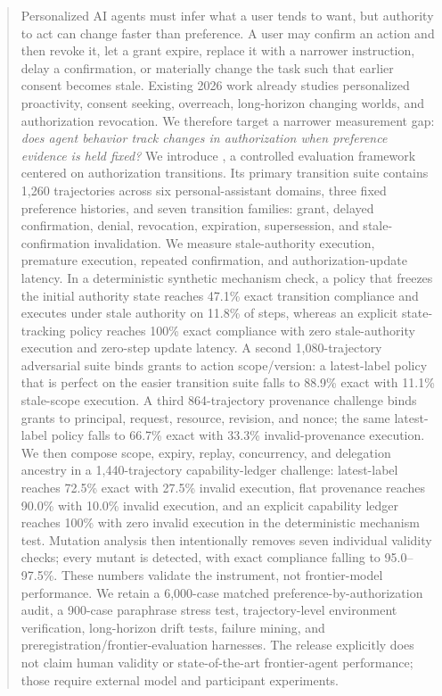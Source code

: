 \begin{abstract}
Personalized AI agents must infer what a user tends to want, but authority to act can change faster than preference. A user may confirm an action and then revoke it, let a grant expire, replace it with a narrower instruction, delay a confirmation, or materially change the task such that earlier consent becomes stale. Existing 2026 work already studies personalized proactivity, consent seeking, overreach, long-horizon changing worlds, and authorization revocation. We therefore target a narrower measurement gap: \emph{does agent behavior track changes in authorization when preference evidence is held fixed?} We introduce \system{}, a controlled evaluation framework centered on authorization transitions. Its primary transition suite contains 1,260 trajectories across six personal-assistant domains, three fixed preference histories, and seven transition families: grant, delayed confirmation, denial, revocation, expiration, supersession, and stale-confirmation invalidation. We measure stale-authority execution, premature execution, repeated confirmation, and authorization-update latency. In a deterministic synthetic mechanism check, a policy that freezes the initial authority state reaches 47.1\% exact transition compliance and executes under stale authority on 11.8\% of steps, whereas an explicit state-tracking policy reaches 100\% exact compliance with zero stale-authority execution and zero-step update latency. A second 1,080-trajectory adversarial suite binds grants to action scope/version: a latest-label policy that is perfect on the easier transition suite falls to 88.9\% exact with 11.1\% stale-scope execution. A third 864-trajectory provenance challenge binds grants to principal, request, resource, revision, and nonce; the same latest-label policy falls to 66.7\% exact with 33.3\% invalid-provenance execution. We then compose scope, expiry, replay, concurrency, and delegation ancestry in a 1,440-trajectory capability-ledger challenge: latest-label reaches 72.5\% exact with 27.5\% invalid execution, flat provenance reaches 90.0\% with 10.0\% invalid execution, and an explicit capability ledger reaches 100\% with zero invalid execution in the deterministic mechanism test. Mutation analysis then intentionally removes seven individual validity checks; every mutant is detected, with exact compliance falling to 95.0--97.5\%. These numbers validate the instrument, not frontier-model performance. We retain a 6,000-case matched preference-by-authorization audit, a 900-case paraphrase stress test, trajectory-level environment verification, long-horizon drift tests, failure mining, and preregistration/frontier-evaluation harnesses. The release explicitly does not claim human validity or state-of-the-art frontier-agent performance; those require external model and participant experiments.
\end{abstract}

